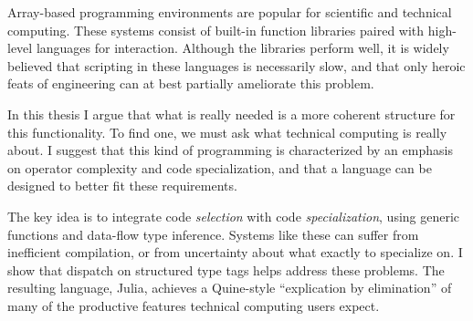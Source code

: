 % 
% 
%

Array-based programming environments are popular for scientific and
technical computing.
These systems consist of built-in function libraries paired with high-level
languages for interaction.
Although the libraries perform well, it is widely believed that scripting in these
languages is necessarily slow, and that only heroic feats of engineering can at
best partially ameliorate this problem.

In this thesis I argue that what is really needed is a more coherent
structure for this functionality.
To find one, we must ask what technical computing is really about.
I suggest that this kind of programming is characterized by an emphasis on operator
complexity and code specialization, and that a language can be designed to
better fit these requirements.

The key idea is to integrate code \emph{selection} with code \emph{specialization},
using generic functions and data-flow type inference.
Systems like these can suffer from inefficient compilation, or from
uncertainty about what exactly to specialize on.
I show that dispatch on structured type tags helps address these problems.
The resulting language, Julia, achieves a Quine-style
``explication by elimination'' of many of the productive features
technical computing users expect.








